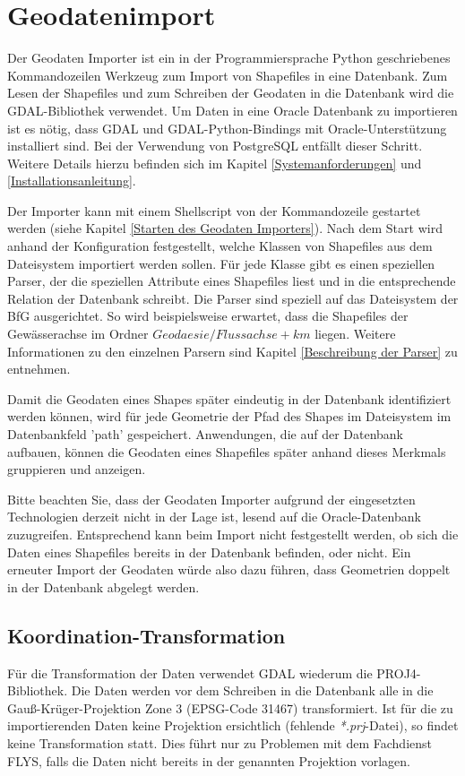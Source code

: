 \section{Geodatenimport}

Der Geodaten Importer ist ein in der Programmiersprache Python
geschriebenes Kommandozeilen Werkzeug zum Import von Shapefiles in
eine Datenbank.
Zum Lesen der Shapefiles und zum Schreiben der Geodaten
in die Datenbank wird die GDAL-Bibliothek verwendet.
Um Daten in eine Oracle Datenbank zu importieren ist es nötig, dass
GDAL und GDAL-Python-Bindings mit Oracle-Unterstützung installiert
sind. Bei der Verwendung von PostgreSQL entfällt dieser Schritt.
Weitere Details hierzu befinden sich im
Kapitel \ref{Systemanforderungen} und \ref{Installationsanleitung}.

Der Importer kann mit einem Shellscript von der Kommandozeile gestartet werden
(siehe Kapitel \ref{Starten des Geodaten Importers}). Nach dem Start wird anhand der
Konfiguration festgestellt, welche Klassen von Shapefiles aus dem Dateisystem
importiert werden sollen. Für jede Klasse gibt es einen speziellen
Parser, der die speziellen Attribute eines Shapefiles liest und in die entsprechende
Relation der Datenbank schreibt. Die Parser sind speziell auf das
Dateisystem der BfG ausgerichtet. So wird beispielsweise erwartet, dass die Shapefiles der
Gewässerachse im Ordner $Geodaesie/Flussachse+km$ liegen. Weitere Informationen zu
den einzelnen Parsern sind Kapitel \ref{Beschreibung der Parser} zu
entnehmen.

Damit die Geodaten eines Shapes später eindeutig in der Datenbank identifiziert
werden können, wird für jede Geometrie der Pfad des Shapes im Dateisystem
im Datenbankfeld 'path' gespeichert. Anwendungen, die auf der Datenbank
aufbauen, können die Geodaten eines Shapefiles später anhand dieses Merkmals
gruppieren und anzeigen.

Bitte beachten Sie, dass der Geodaten Importer aufgrund der eingesetzten
Technologien derzeit nicht in der Lage ist, lesend auf die Oracle-Datenbank
zuzugreifen. Entsprechend kann beim Import nicht festgestellt werden, ob sich
die Daten eines Shapefiles bereits in der Datenbank befinden, oder nicht.
Ein erneuter Import der Geodaten würde also dazu führen, dass Geometrien doppelt in der
Datenbank abgelegt werden.

\subsection{Koordination-Transformation}
Für die Transformation der Daten verwendet GDAL wiederum die PROJ4-Bibliothek.
Die Daten werden vor dem Schreiben in die Datenbank alle
in die Gauß-Krüger-Projektion Zone 3 (EPSG-Code 31467) transformiert.
Ist für die zu importierenden Daten keine Projektion ersichtlich
(fehlende \textit{*.prj}-Datei), so findet keine Transformation statt.
Dies führt nur zu Problemen mit dem Fachdienst FLYS, falls die Daten nicht
bereits in der genannten Projektion vorlagen.

